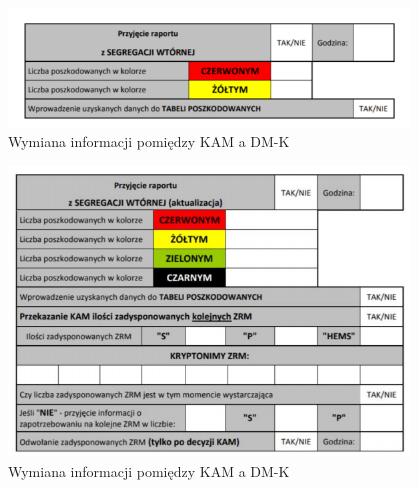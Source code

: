 \begin{figure}[h!]
  \centering
    \includegraphics[width=0.95\textwidth]{img/Kamtodmk2.png}
  \caption{Wymiana informacji pomiędzy KAM a DM-K} 
  \label{fig:org}                                       
\end{figure}

\begin{figure}[h!]
  \centering
    \includegraphics[width=0.95\textwidth]{img/Kamtodmk3.png}
  \caption{Wymiana informacji pomiędzy KAM a DM-K} 
  \label{fig:org}                                       
\end{figure}

